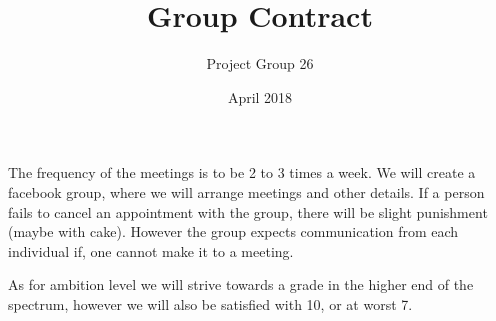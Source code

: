 \documentclass[11pt]{article}
\title{Group Contract}
\author{Project Group 26}
\date{April 2018}
\begin{document}
\maketitle

The frequency of the meetings is to be 2 to 3 times a week. We will create a facebook group, where we will arrange meetings and other details. If a person fails to cancel an appointment with the group, there will be slight punishment (maybe with cake). However the group expects communication from each individual if, one cannot make it to a meeting.







As for ambition level we will strive towards a grade in the higher end of the spectrum, however we will also be satisfied with 10, or at worst 7.


\end{document}
